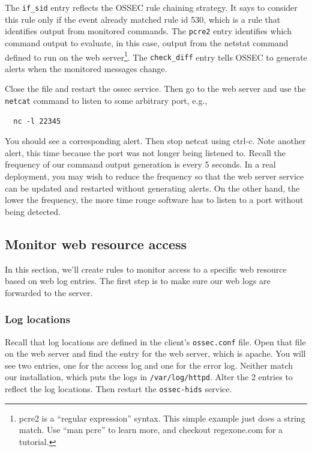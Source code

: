 The {\tt if\_sid} entry reflects the OSSEC rule chaining strategy.  It says to consider this rule only if the event
already matched rule id 530, which is a rule that identifies output from monitored commands.
The {\tt pcre2} entry identifies which command output to evaluate, in this case, output from the netstat command defined
to run on the web server\footnote{pcre2 is a ``regular expression'' syntax.  This simple example just does a string match.
Use ``man pcre'' to learn more, and checkout regexone.com for a tutorial.}.  The {\tt check\_diff} entry tells OSSEC to generate alerts when the monitored messages change.

Close the file and restart the ossec service.  Then go to the web server and use the {\tt netcat} command to listen to some
arbitrary port, e.g.,
\begin{verbatim}
  nc -l 22345
\end{verbatim}

\noindent You should see a corresponding alert.   Then stop netcat using ctrl-c.  Note another alert, this time because the 
port was not longer being listened to.  Recall the frequency of our command output generation is every 5 seconds.  In a real 
deployment, you may wish to reduce the frequency so that the web server service can be updated and restarted without 
generating alerts.  On the  other hand, the lower the frequency, the more time rouge software has to listen to a port
without being detected.

\subsection{Monitor web resource access}
In this section, we'll create rules to monitor access to a specific web resource based on web log entries.  
The first step is to make sure our web logs are forwarded to the server.  

\subsubsection{Log locations}
Recall that log locations are defined
in the client's {\tt ossec.conf} file.  Open that file on the web server and find the entry for the web server,
which is apache. You will see two entries, one for the access log and one for the error log.  Neither match our
installation, which puts the logs in {\tt /var/log/httpd}.  Alter the 2 entries to reflect the log locations.
Then restart the {\tt ossec-hids} service.

